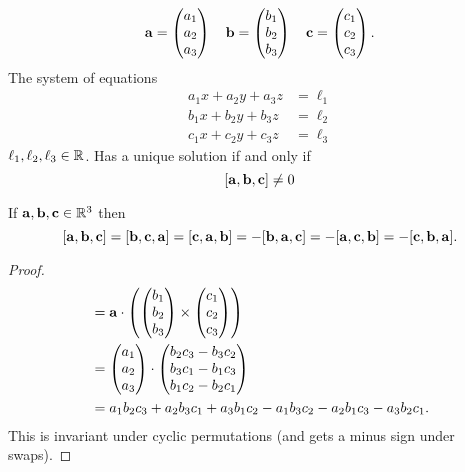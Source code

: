 \documentclass[10pt, a4paper]{article}
\begin{document}
\[
\mathbf{a} = \begin{pmatrix}
    a_1 \\ a_2 \\ a_3
\end{pmatrix}\quad\mathbf{b} = \begin{pmatrix}
    b_1 \\ b_2 \\ b_3
\end{pmatrix}\quad\mathbf{c} = \begin{pmatrix}
    c_1 \\ c_2 \\ c_3
\end{pmatrix}.
\]
The system of equations
\begin{align*}
    a_1 x + a_2 y + a_3 z &= \ell_1 \\
    b_1 x + b_2 y + b_3 z &= \ell_2 \\
    c_1 x + c_2 y + c_3 z &= \ell_3
\end{align*}
$\ell_1, \ell_2, \ell_3 \in \mathbb{R}$.
Has a unique solution if and only if
\[
[\mathbf{a}, \mathbf{b}, \mathbf{c}] \neq 0
\]

\begin{proposition}
    If $\mathbf{a, b, c} \in \mathbb{R} ^ 3$ then
    \[
    [\mathbf{a}, \mathbf{b}, \mathbf{c}] = [\mathbf{b}, \mathbf{c}, \mathbf{a}] = [\mathbf{c}, \mathbf{a}, \mathbf{b}] = -[\mathbf{b}, \mathbf{a}, \mathbf{c}] = -[\mathbf{a}, \mathbf{c}, \mathbf{b}] = -[\mathbf{c}, \mathbf{b}, \mathbf{a}].
    \]
    \begin{proof}
        \begin{align*}
        [\mbf{a}, \mbf{b}, \mbf{c}] &= \mbf{a} \cdot \left(\begin{pmatrix}
            b_1 \\ b_2 \\ b_3
        \end{pmatrix} \times
        \begin{pmatrix}
            c_1 \\ c_2 \\ c_3
        \end{pmatrix}\right) \\
        &= \begin{pmatrix}
            a_1 \\ a_2 \\ a_3
        \end{pmatrix}
        \cdot
        \begin{pmatrix}
            b_2 c_3 - b_3 c_2 \\ b_3 c_1 - b_1 c_3 \\ b_1 c_2 - b_2 c_1
        \end{pmatrix} \\
        &= a_1 b_2 c_3 + a_2 b_3 c_1 + a_3 b_1 c_2 - a_1 b_3 c_2 - a_2 b_1 c_3 - a_3 b_2 c_1.
        \end{align*}
        This is invariant under cyclic permutations (and gets a minus sign under swaps).
    \end{proof}
\end{proposition}
\end{document}
